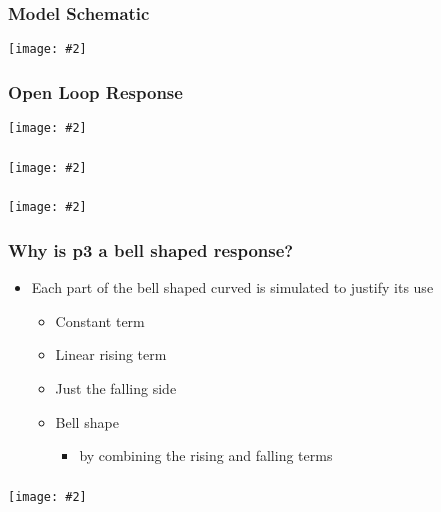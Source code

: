 \documentclass{beamer}
\newcommand{\plotslide}[2]{
  \begin{frame}
    \frametitle{#1}
    \centering
    \texttt{[image: \#2]}
  \end{frame}
}
\begin{document}
\plotslide{Model Schematic}{../tikz/flow.pdf}

\iffalse
\plotslide{Constant p4}{constant_p4_func.pdf}
\plotslide{Constant p4}{p4a_sign_change_Sves.pdf}
\plotslide{Constant p4}{p4a_sign_change_MI.pdf}

\begin{frame}
  \frametitle{Constant p4}
  \begin{itemize}
    \item Positive amp is good for native
    \item Negative amp is good for overexpressed
    \item Smoothly change amp w.r.t expression level
  \end{itemize}
\end{frame}

\plotslide{Coupled p4}{coupled_p4_func.pdf}
\plotslide{Coupled p4}{Sves_coupled_p4.pdf}
\plotslide{Coupled p4}{MI_coupled_p4.pdf}

\fi


\plotslide{Open Loop Response}{../tikz/flow_stot.pdf}
\plotslide{}{StotVsMAPKpp.pdf}

\plotslide{}{SmemVsp3.pdf}

\begin{frame}
  \frametitle{Why is p3 a bell shaped response?}
  \begin{itemize}
    \itemsep3em
    \item Each part of the bell shaped curved is simulated to justify its use
    \begin{itemize}
      \item Constant term
      \item Linear rising term
      \item Just the falling side
      \item Bell shape
      \begin{itemize}
        \item by combining the rising and falling terms 
      \end{itemize}
    \end{itemize}
  \end{itemize}
\end{frame}

\plotslide{}{p3effects-params.pdf}
\end{document}
